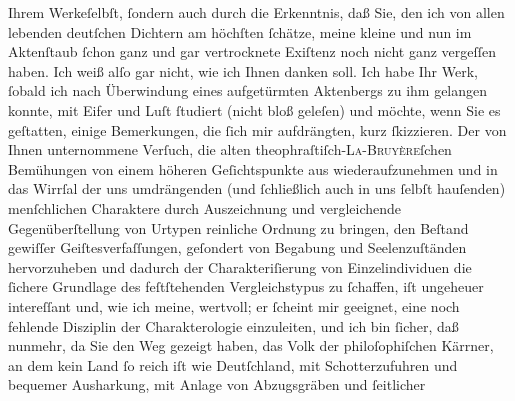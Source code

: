 \begin{ledgroupsized}[t]{13cm}
               Ihrem Werkeſelbſt, ſondern auch durch die Erkenntnis, daß Sie,
               den ich von allen lebenden deutſchen Dichtern am höchſten ſchätze, meine kleine und
               nun im Aktenſtaub ſchon ganz und gar vertrocknete Exiſtenz noch nicht ganz vergeſſen
               haben. Ich weiß alſo gar nicht, wie ich Ihnen danken soll.\pend
           \pstart
           Ich habe Ihr Werk, ſobald ich
               nach Überwindung eines aufgetürmten Ak{\pb}tenbergs zu ihm gelangen konnte, mit Eifer und Luſt ſtudiert (nicht bloß geleſen)
               und möchte, wenn Sie es geſtatten, einige Bemerkungen, die ſich mir aufdrängten, kurz
               ſkizzieren.\pend
           \pstart
           Der von Ihnen unternommene Verſuch, die alten theophraſtiſch-\textsc{La-Bruyère}ſchen Bemühungen von einem höheren Geſichtspunkte aus wiederaufzunehmen und in
               das Wirrſal der uns umdrängenden (und ſchließlich auch in uns ſelbſt hauſenden)
               menſchlichen Charaktere durch Auszeichnung und vergleichende Gegenüberſtellung von
               Urtypen reinliche Ordnung zu bringen, den Beſtand gewiſſer Geiſtesverfaſſungen,
               geſondert von Begabung und Seelenzuſtänden hervorzuheben und dadurch der
               Charakteriſierung von Einzelindividuen die ſichere Grundlage des feſtſtehenden
               Vergleichstypus {\pb}zu ſchaffen, iſt
               ungeheuer intereſſant und, wie ich meine, wertvoll; er ſcheint mir geeignet, eine
               noch fehlende Disziplin der Charakterologie einzuleiten, und ich bin ſicher, daß
               nunmehr, da Sie den Weg gezeigt haben, das Volk der philoſophiſchen Kärrner, an dem
               kein Land ſo reich iſt wie Deutſchland, mit
               Schotterzufuhren und bequemer Ausharkung, mit Anlage von Abzugsgräben und ſeitlicher

\end{ledgroupsized}
